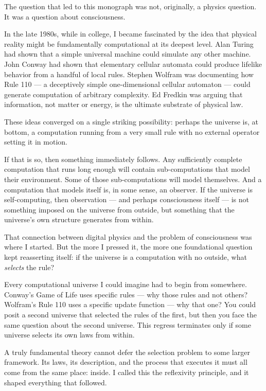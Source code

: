 \documentclass[11pt,openany]{book}
\theoremstyle{remark}
\begin{document}
The question that led to this monograph was not, originally, a physics question.
It was a question about consciousness.

In the late 1980s, while in college, I became fascinated by the idea that physical reality might be
fundamentally computational at its deepest level.
Alan Turing had shown that a simple universal machine could simulate any other machine.
John Conway had shown that elementary cellular automata could produce lifelike behavior
from a handful of local rules.
Stephen Wolfram was documenting how Rule 110 --- a deceptively simple one-dimensional
cellular automaton --- could generate computation of arbitrary complexity.
Ed Fredkin was arguing that information, not matter or energy, is the ultimate substrate
of physical law.

These ideas converged on a single striking possibility: perhaps the universe is, at bottom,
a computation running from a very small rule with no external operator setting it in motion.

If that is so, then something immediately follows.
Any sufficiently complete computation that runs long enough will contain sub-computations
that model their environment.
Some of those sub-computations will model themselves.
And a computation that models itself is, in some sense, an observer.
If the universe is self-computing, then observation --- and perhaps consciousness itself
--- is not something imposed on the universe from outside, but something that the
universe's own structure generates from within.

\medskip

That connection between digital physics and the problem of consciousness was where
I started.
But the more I pressed it, the more one foundational question kept reasserting itself:
if the universe is a computation with no outside, what \emph{selects} the rule?

Every computational universe I could imagine had to begin from somewhere.
Conway's Game of Life uses specific rules --- why those rules and not others?
Wolfram's Rule 110 uses a specific update function --- why that one?
You could posit a second universe that selected the rules of the first, but then you
face the same question about the second universe.
This regress terminates only if some universe selects its own laws from within.

A truly fundamental theory cannot defer the selection problem to some larger framework.
Its laws, its description, and the process that executes it must all come from the same
place: inside.
I called this the reflexivity principle, and it shaped everything that followed.
\end{document}
